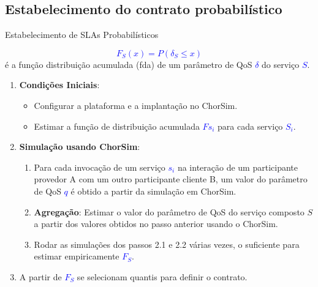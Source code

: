 \documentclass[xcolor=svgnames]{beamer}
\begin{document}
  \subsection{Estabelecimento do contrato probabilístico}

  \begin{frame}{Estabelecimento de SLAs Probabilísticos}

        \textcolor{Blue}{$$F_S(x) = P(\delta_S \leq x)$$ } é a função distribuição acumulada (fda) de um parâmetro
       de QoS \textcolor{Blue}{$\delta$} do serviço \textcolor{Blue}{$S$}.
      \pause

      \begin{enumerate}
      \item <1->\textbf{Condições Iniciais}:
	  \begin{itemize}
	    \item <1-> Configurar a plataforma e a implantação no ChorSim.
	    \item <2-> Estimar a função de distribuição acumulada \textcolor{Blue}{$Fs_i$} para cada  serviço \textcolor{Blue}{$S_i$}.
	  \end{itemize}

      \item <3-> \textbf{Simulação usando \textbf{ChorSim}}:
	  \begin{enumerate}
	  \item <3-> \label{a} Para cada invocação de um serviço \textcolor{Blue}{$s_i$} na interação de um participante
	    provedor A com um outro participante cliente B, um valor do parâmetro de QoS \textcolor{Blue}{$q$}
	    é obtido a partir da simulação em ChorSim.%
	  \item <4-> \label{b} \textbf{Agregação}: Estimar o valor do parâmetro de QoS do serviço composto $S$ a partir dos valores obtidos
	  no passo anterior usando o ChorSim. %

	  \item <5-> Rodar as simulações dos passos 2.1 e 2.2 várias vezes, o suficiente para estimar  empiricamente \textcolor{Blue}{$F_S$}.%
	  \end{enumerate}

	\item <6-> A partir de \textcolor{Blue}{$F_S$}  se selecionam quantis para definir o contrato.

    \end{enumerate}
  \end{frame}
\end{document}
